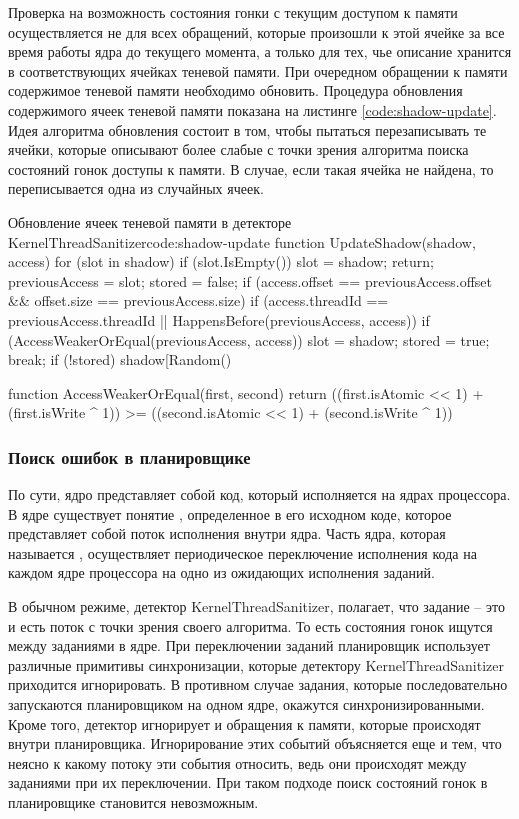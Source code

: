 Проверка на возможность состояния гонки с текущим доступом к памяти осуществляется не для всех обращений, которые произошли к этой ячейке за все время работы ядра до текущего момента, а только для тех, чье описание хранится в соответствующих ячейках теневой памяти.
При очередном обращении к памяти содержимое теневой памяти необходимо обновить.
Процедура обновления содержимого ячеек теневой памяти показана на листинге \ref{code:shadow-update}.
Идея алгоритма обновления состоит в том, чтобы пытаться перезаписывать те ячейки, которые описывают более слабые с точки зрения алгоритма поиска состояний гонок доступы к памяти.
В случае, если такая ячейка не найдена, то переписывается одна из случайных ячеек.

\begin{listing}{Обновление ячеек теневой памяти в детекторе KernelThreadSanitizer}{code:shadow-update}
function UpdateShadow(shadow, access) {
  for (slot in shadow) {
    if (slot.IsEmpty()) {
      slot = shadow;
      return;
    }
    previousAccess = slot;
    stored = false;
    if (access.offset == previousAccess.offset &&
        offset.size == previousAccess.size) {
      if (access.threadId == previousAccess.threadId ||
          HappensBefore(previousAccess, access)) {
        if (AccessWeakerOrEqual(previousAccess, access)) {
          slot = shadow;
          stored = true;
        }
      }
      break;
    }
  }
  if (!stored)
    shadow[Random() %
}

function AccessWeakerOrEqual(first, second) {
  return ((first.isAtomic << 1) + (first.isWrite ^ 1)) >= ((second.isAtomic << 1) + (second.isWrite ^ 1))
}
\end{listing}


\subsubsection{Поиск ошибок в планировщике}

По сути, ядро представляет собой код, который исполняется на ядрах процессора.
В ядре существует понятие , определенное в его исходном коде, которое представляет собой поток исполнения внутри ядра.
Часть ядра, которая называется , осуществляет периодическое переключение исполнения кода на каждом ядре процессора на одно из ожидающих исполнения заданий.

В обычном режиме, детектор KernelThreadSanitizer, полагает, что задание -- это и есть поток с точки зрения своего алгоритма.
То есть состояния гонок ищутся между заданиями в ядре.
При переключении заданий планировщик использует различные примитивы синхронизации, которые детектору KernelThreadSanitizer приходится игнорировать.
В противном случае задания, которые последовательно запускаются планировщиком на одном ядре, окажутся синхронизированными.
Кроме того, детектор игнорирует и обращения к памяти, которые происходят внутри планировщика.
Игнорирование этих событий объясняется еще и тем, что неясно к какому потоку эти события относить, ведь они происходят между заданиями при их переключении.
При таком подходе поиск состояний гонок в планировщике становится невозможным.

